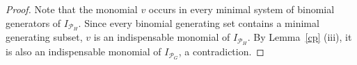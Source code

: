 \documentclass[12pt]{amsart}
\theoremstyle{definition}
\numberwithin{thm}{section}
\numberwithin{equation}{section}
\def\a{\alpha}
\begin{document}
\begin{proof}
\medskip

Note that the monomial \(v\) occurs in every minimal system of binomial generators of \(I_{\mathcal P_H}\). Since every binomial generating set contains a minimal generating subset, \(v\) is an indispensable monomial of \(I_{\mathcal P_H}\). By Lemma~\ref{cp} (iii), it is also an indispensable monomial of \(I_{\mathcal{P}_G}\), a contradiction.

\bigskip


\end{proof}
\end{document}
